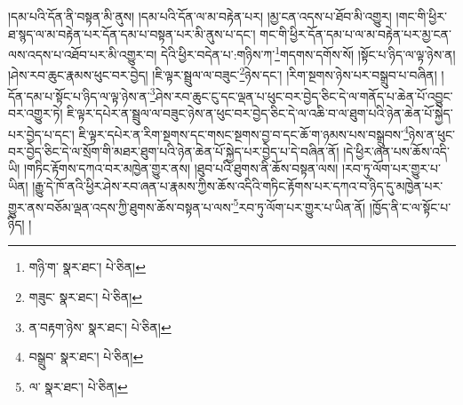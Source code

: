 །དམ་པའི་དོན་ནི་བསྟན་མི་ནུས། །དམ་པའི་དོན་ལ་མ་བརྟེན་པར། །མྱ་ངན་འདས་པ་ཐོབ་མི་འགྱུར། །གང་གི་ཕྱིར་ཐ་སྙད་ལ་མ་བརྟེན་པར་དོན་དམ་པ་བསྟན་པར་མི་ནུས་པ་དང་། གང་གི་ཕྱིར་དོན་དམ་པ་ལ་མ་བརྟེན་པར་མྱ་ངན་ལས་འདས་པ་འཐོབ་པར་མི་འགྱུར་བ། དེའི་ཕྱིར་བདེན་པ་:གཉིས་ཀ་\footnote{གཉི་ག་  སྣར་ཐང་།  པེ་ཅིན། }གདགས་དགོས་སོ། །སྟོང་པ་ཉིད་ལ་ལྟ་ཉེས་ན། །ཤེས་རབ་ཆུང་རྣམས་ཕུང་བར་བྱེད། །ཇི་ལྟར་སྦྲུལ་ལ་བཟུང་\footnote{གཟུང་  སྣར་ཐང་།  པེ་ཅིན། }ཉེས་དང་། །རིག་སྔགས་ཉེས་པར་བསྒྲུབ་པ་བཞིན། །དོན་དམ་པ་སྟོང་པ་ཉིད་ལ་ལྟ་ཉེས་ན་\footnote{ན་བརྟག་ཉེས་  སྣར་ཐང་།  པེ་ཅིན། }ཤེས་རབ་ཆུང་ངུ་དང་ལྡན་པ་ཕུང་བར་བྱེད་ཅིང་དེ་ལ་གནོད་པ་ཆེན་པོ་འབྱུང་བར་འགྱུར་ཏེ། ཇི་ལྟར་དཔེར་ན་སྦྲུལ་ལ་བཟུང་ཉེས་ན་ཕུང་བར་བྱེད་ཅིང་དེ་ལ་འཆི་བ་ལ་ཐུག་པའི་ཉེན་ཆེན་པོ་སྐྱེད་པར་བྱེད་པ་དང་། ཇི་ལྟར་དཔེར་ན་རིག་སྔགས་དང་གསང་སྔགས་བྱ་བ་དང་ཆོ་ག་ཉམས་པས་བསྒྲུབས་\footnote{བསྒྲུབ་  སྣར་ཐང་།  པེ་ཅིན། }ཉེས་ན་ཕུང་བར་བྱེད་ཅིང་དེ་ལ་སྲོག་གི་མཐར་ཐུག་པའི་ཉེན་ཆེན་པོ་སྐྱེད་པར་བྱེད་པ་དེ་བཞིན་ནོ། །དེ་ཕྱིར་ཞན་པས་ཆོས་འདི་ཡི། །གཏིང་རྟོགས་དཀའ་བར་མཁྱེན་གྱུར་ནས། །ཐུབ་པའི་ཐུགས་ནི་ཆོས་བསྟན་ལས། །རབ་ཏུ་ལོག་པར་གྱུར་པ་ཡིན། །རྒྱུ་དེ་ཁོ་ནའི་ཕྱིར་ཤེས་རབ་ཞན་པ་རྣམས་ཀྱིས་ཆོས་འདིའི་གཏིང་རྟོགས་པར་དཀའ་བ་ཉིད་དུ་མཁྱེན་པར་གྱུར་ནས་བཅོམ་ལྡན་འདས་ཀྱི་ཐུགས་ཆོས་བསྟན་པ་ལས་\footnote{ལ་  སྣར་ཐང་།  པེ་ཅིན། }རབ་ཏུ་ལོག་པར་གྱུར་པ་ཡིན་ནོ། །ཁྱོད་ནི་ང་ལ་སྟོང་པ་ཉིད། །
